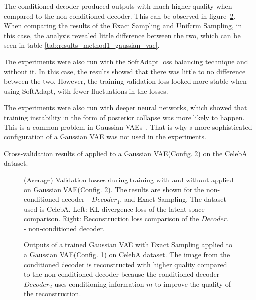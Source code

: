 The conditioned decoder produced outputs with much higher quality when compared to the non-conditioned decoder. This can be observed in figure~\ref{fig:rec_gaussian}. When comparing the results of the Exact Sampling and Uniform Sampling, in this case, the analysis revealed little difference between the two, which can be seen in table \ref{tab:results_method1_gaussian_vae}.

The experiments were also run with the SoftAdapt loss balancing technique and without it. In this case, the results showed
that there was little to no difference between the two. However, the training validation loss looked more stable when using SoftAdapt, with fewer fluctuations in the losses.

The experiments were also run with deeper neural networks, which showed that training instability in the form of posterior collapse was more likely to happen. This is a common problem in Gaussian VAEs~\cite{wang2023posterior}. That is why a more sophisticated configuration of a Gaussian VAE was not used in the experiments. 


\begin{table}[H]
    \centering
    
    \caption{Cross-validation results of  applied to a Gaussian VAE(Config. 2) on the CelebA dataset.}
    \label{tab:results_method1_gaussian_vae}
\end{table}

\begin{figure}[H]
    \centering
    \scalebox{0.48}{}
    \scalebox{0.48}{}
    \caption[Validation loss during training of a Gaussian VAE.]
    {
        (Average) Validation losses during training with and without  applied on Gaussian VAE(Config. 2). The results are shown for the non-conditioned decoder - $Decoder_1$, and Exact Sampling. The dataset used is CelebA.
        Left: KL divergence loss of the latent space comparison. Right: Reconstruction loss comparison of the $Decoder_1$ - non-conditioned decoder.
    }
    \label{fig:results_method1_gaussian_vae}
\end{figure}


\begin{figure}[H]
    \centering
    
    \caption[Trained neural network with  applied to a Gaussian VAE.]
    { 
        Outputs of a trained Gaussian VAE with  Exact Sampling applied to a Gaussian VAE(Config. 1) on CelebA dataset. The image from the conditioned decoder is reconstructed with higher quality compared to the non-conditioned decoder because the conditioned decoder $Decoder_2$ uses conditioning information $m$ to improve the quality of the reconstruction.
    }
    \label{fig:rec_gaussian}
\end{figure}

